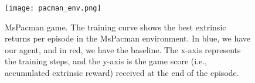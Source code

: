 \begin{figure}[htb]
     \centering
         \centering
         \texttt{[image: pacman\_env.png]}
         \caption{MsPacman game. The training curve shows the best extrinsic returns per episode in the MsPacman environment. In blue, we have our agent, and in red, we have the baseline. The x-axis represents the training steps, and the y-axis is the game score (i.e., accumulated extrinsic reward) received at the end of the episode.}
        \label{fig:pacman_resultados}
\end{figure}



